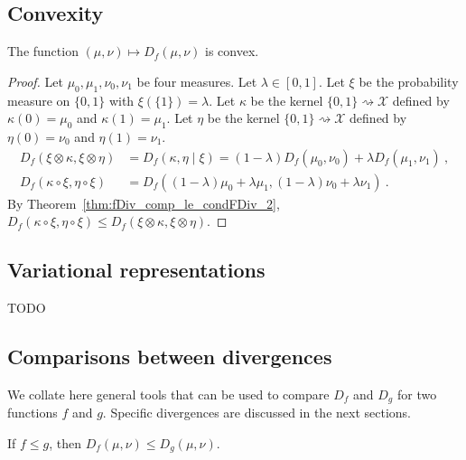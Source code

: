 \subsection{Convexity}

\begin{theorem}
  \label{thm:fDiv_convex}
  \leanok
  The function $(\mu, \nu) \mapsto D_f(\mu, \nu)$ is convex.
\end{theorem}

\begin{proof}\leanok
{}
Let $\mu_0, \mu_1, \nu_0, \nu_1$ be four measures. Let $\lambda \in [0,1]$. Let $\xi$ be the probability measure on $\{0,1\}$ with $\xi(\{1\}) = \lambda$.
Let $\kappa$ be the kernel $\{0,1\} \rightsquigarrow \mathcal X$ defined by $\kappa(0) = \mu_0$ and $\kappa(1) = \mu_1$.
Let $\eta$ be the kernel $\{0,1\} \rightsquigarrow \mathcal X$ defined by $\eta(0) = \nu_0$ and $\eta(1) = \nu_1$.
\begin{align*}
D_f(\xi \otimes \kappa, \xi \otimes \eta)
&= D_f(\kappa, \eta \mid \xi)
= (1 - \lambda) D_f(\mu_0, \nu_0) + \lambda D_f(\mu_1, \nu_1)
\: , \\
D_f(\kappa \circ \xi, \eta \circ \xi)
&= D_f((1 - \lambda)\mu_0 + \lambda \mu_1, (1 - \lambda)\nu_0 + \lambda \nu_1)
\: .
\end{align*}
By Theorem~\ref{thm:fDiv_comp_le_condFDiv_2}, $D_f(\kappa \circ \xi, \eta \circ \xi) \le D_f(\xi \otimes \kappa, \xi \otimes \eta)$.
\end{proof}



\subsection{Variational representations}

TODO




\subsection{Comparisons between divergences}

We collate here general tools that can be used to compare $D_f$ and $D_g$ for two functions $f$ and $g$.
Specific divergences are discussed in the next sections.

\begin{lemma}
  \label{lem:fDiv_mono_fun}
  \leanok
  If $f \le g$, then $D_f(\mu, \nu) \le D_g(\mu, \nu)$.
\end{lemma}

